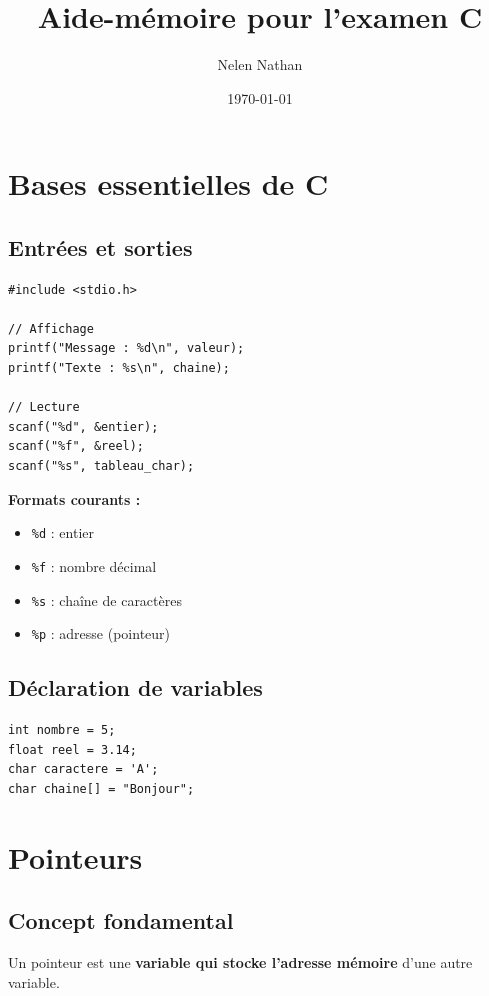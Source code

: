 \documentclass[12pt,a4paper]{article}
\title{\textbf{Aide-mémoire pour l'examen C}}
\author{Nelen Nathan}
\date{\today}
\begin{document}
\maketitle
\tableofcontents
\newpage

\section{Bases essentielles de C}

\subsection{Entrées et sorties}

\begin{lstlisting}
#include <stdio.h>

// Affichage
printf("Message : %d\n", valeur);
printf("Texte : %s\n", chaine);

// Lecture
scanf("%d", &entier);
scanf("%f", &reel);
scanf("%s", tableau_char);
\end{lstlisting}

\textbf{Formats courants :}
\begin{itemize}
    \item \texttt{\%d} : entier
    \item \texttt{\%f} : nombre décimal
    \item \texttt{\%s} : chaîne de caractères
    \item \texttt{\%p} : adresse (pointeur)
\end{itemize}

\subsection{Déclaration de variables}

\begin{lstlisting}
int nombre = 5;
float reel = 3.14;
char caractere = 'A';
char chaine[] = "Bonjour";
\end{lstlisting}

\section{Pointeurs}

\subsection{Concept fondamental}

Un pointeur est une \textbf{variable qui stocke l'adresse mémoire} d'une autre variable.
\end{document}
